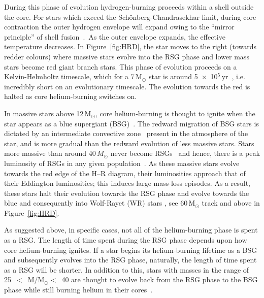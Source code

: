 During this phase of evolution hydrogen-burning proceeds within a shell outside the core.
For stars which exceed the Sch\"onberg-Chandrasekhar limit, during core contraction the outer hydrogen envelope will expand owing to the ``mirror principle'' of shell fusion~\citep[e.g.][]{2012MNRAS.421.2713B}.\footnotemark~As the outer envelope expands, the effective temperature decreases.
In Figure~\ref{fig:HRD}, the star moves to the right (towards redder colours) where massive stars evolve into the RSG phase and lower mass stars become red giant branch stars.
This phase of evolution proceeds on a Kelvin-Helmholtz timescale, which for a 7\,M$_{\odot}$ star is around 5~$\times$~10$^{5}$\,yr~\citep{2012sse..book.....K}, i.e. incredibly short on an evolutionary timescale.
The evolution towards the red is halted as core helium-burning switches on.


In massive stars above 12\,M$_{\odot}$, core helium-burning is thought to ignite when the star appears as a blue supergiant (BSG)~\citep{Meynet11,2012A&A...537A.146E,Langer12,Saio13}.
The redward migration of BSG stars is dictated by an intermediate convective zone~\citep{Meynet11} present in the atmosphere of the star, and is more gradual than the redward evolution of less massive stars.
Stars more massive than around 40\,$M_{\odot}$ never become RSGs~\citep{Massey03,Meynet11,2012A&A...537A.146E} and hence, there is a peak luminosity of RSGs in any given population~\citep{1979ApJ...232..409H}.
As these massive stars evolve towards the red edge of the H--R diagram, their luminosities approach that of their Eddington luminosities; this induces large mass-loss episodes.
As a result, these stars halt their evolution towards the RSG phase and evolve towards the blue and consequently into Wolf-Rayet (WR) stars
\citep{2007ARA&A..45..177C, Vink09}, see 60\,M$_{\odot}$ track and above in Figure~\ref{fig:HRD}.

As suggested above, in specific cases, not all of the helium-burning phase is spent as a RSG.
The length of time spent during the RSG phase depends upon how core helium-burning ignites.
If a star begins its helium-burning lifetime as a BSG and subsequently evolves into the RSG phase, naturally, the length of time spent as a RSG will be shorter.
In addition to this, stars with masses in the range of 25~$<$~M/M$_{\odot}<$~40 are thought to evolve back from the RSG phase to the BSG phase while still burning helium in their cores~\citep{2012A&A...537A.146E}.


